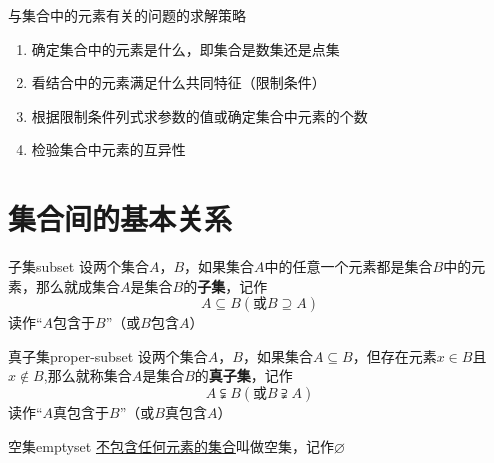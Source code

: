 \begin{note}{与集合中的元素有关的问题的求解策略}
	\begin{enumerate}
		\item 确定集合中的元素是什么，即集合是\textcolor{main}{数集}还是\textcolor{main}{点集}
		\item 看结合中的元素满足什么\textcolor{main}{共同特征（限制条件）}
		\item 根据限制条件列式求参数的值或确定集合中元素的个数
		\item 检验集合中元素的\textcolor{main}{互异性}
	\end{enumerate}
\end{note}


\section{集合间的基本关系}

\begin{definition}{子集}{subset}
设两个集合$A$，$B$，如果集合$A$中的任意一个元素都是集合$B$中的元素，那么就成集合$A$是集合$B$的\textcolor{third}{\textbf{子集}}，记作
\begin{equation}
A \subseteq B \left(\mbox{或} B \supseteq A \right)
\end{equation}
读作“$A$包含于$B$”（或$B$包含$A$）
\end{definition}

\begin{definition}{真子集}{proper-subset}
设两个集合$A$，$B$，如果集合$A \subseteq B $，但存在元素$x \in B$且$x \notin B$,那么就称集合$A$是集合$B$的\textcolor{third}{\textbf{真子集}}，记作
\begin{equation}
A \subsetneqq B \left(\mbox{或} B \supsetneqq A \right)
\end{equation}
读作“$A$真包含于$B$”（或$B$真包含$A$）
\end{definition}

\begin{definition}{空集}{emptyset}
\underline{不包含任何元素的集合}叫做\textcolor{third}{空集}，记作$\varnothing$
\end{definition}

